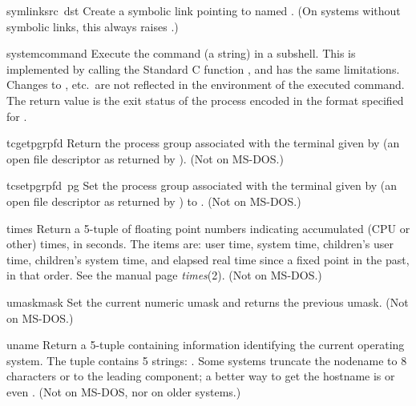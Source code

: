 \begin{funcdesc}{symlink}{src\, dst}
Create a symbolic link pointing to  named .  (On
systems without symbolic links, this always raises
.)
\end{funcdesc}

\begin{funcdesc}{system}{command}
Execute the command (a string) in a subshell.  This is implemented by
calling the Standard C function , and has the same
limitations.  Changes to ,  etc.\ are
not reflected in the environment of the executed command.  The return
value is the exit status of the process encoded in the format
specified for .
\end{funcdesc}

\begin{funcdesc}{tcgetpgrp}{fd}
Return the process group associated with the terminal given by
 (an open file descriptor as returned by ).
(Not on MS-DOS.)
\end{funcdesc}

\begin{funcdesc}{tcsetpgrp}{fd\, pg}
Set the process group associated with the terminal given by
 (an open file descriptor as returned by )
to .
(Not on MS-DOS.)
\end{funcdesc}

\begin{funcdesc}{times}{}
Return a 5-tuple of floating point numbers indicating accumulated (CPU
or other)
times, in seconds.  The items are: user time, system time, children's
user time, children's system time, and elapsed real time since a fixed
point in the past, in that order.  See the \UNIX{}
manual page \emph{times}(2).  (Not on MS-DOS.)
\end{funcdesc}

\begin{funcdesc}{umask}{mask}
Set the current numeric umask and returns the previous umask.
(Not on MS-DOS.)
\end{funcdesc}

\begin{funcdesc}{uname}{}
Return a 5-tuple containing information identifying the current
operating system.  The tuple contains 5 strings:
.
Some systems truncate the nodename to 8
characters or to the leading component; a better way to get the
hostname is  or even
.
(Not on MS-DOS, nor on older \UNIX{} systems.)
\end{funcdesc}

